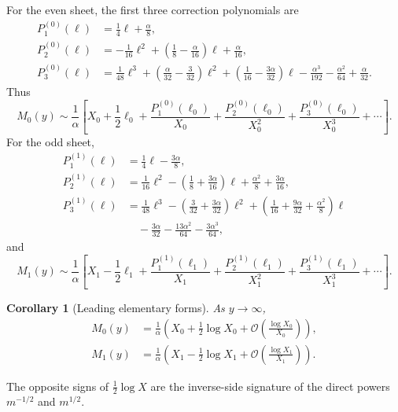 \documentclass[11pt,a4paper]{article}
\theoremstyle{clean}
\newtheorem{corollary}[theorem]{Corollary}
\theoremstyle{definition}
\newcommand{\al}{\alpha}
\newcommand{\OO}{\mathcal O}
\begin{document}
For the even sheet, the first three correction polynomials are
\begin{align}
 P_1^{(0)}(\ell)&=\frac14\ell+\frac\al8,
 \label{eq:P-even-1}\\
 P_2^{(0)}(\ell)&=-\frac1{16}\ell^2
 +\left(\frac18-\frac\al{16}\right)\ell+\frac\al{16},
 \label{eq:P-even-2}\\
 P_3^{(0)}(\ell)&=\frac1{48}\ell^3
 +\left(\frac\al{32}-\frac3{32}\right)\ell^2
 +\left(\frac1{16}-\frac{3\al}{32}\right)\ell
 -\frac{\al^3}{192}-\frac{\al^2}{64}+\frac\al{32}.
 \label{eq:P-even-3}
\end{align}
Thus
\begin{equation}
 M_0(y)\sim\frac1\al\left[
 X_0+\frac12\ell_0+
 \frac{P_1^{(0)}(\ell_0)}{X_0}+
 \frac{P_2^{(0)}(\ell_0)}{X_0^2}+
 \frac{P_3^{(0)}(\ell_0)}{X_0^3}+\cdots\right].
 \label{eq:M0-polylog}
\end{equation}
For the odd sheet,
\begin{align}
 P_1^{(1)}(\ell)&=\frac14\ell-\frac{3\al}{8},
 \label{eq:P-odd-1}\\
 P_2^{(1)}(\ell)&=\frac1{16}\ell^2
 -\left(\frac18+\frac{3\al}{16}\right)\ell
 +\frac{\al^2}{8}+\frac{3\al}{16},
 \label{eq:P-odd-2}\\
 P_3^{(1)}(\ell)&=\frac1{48}\ell^3
 -\left(\frac3{32}+\frac{3\al}{32}\right)\ell^2
 +\left(\frac1{16}+\frac{9\al}{32}+\frac{\al^2}{8}\right)\ell
 \nonumber\\
 &\quad-\frac{3\al}{32}-\frac{13\al^2}{64}-\frac{3\al^3}{64},
 \label{eq:P-odd-3}
\end{align}
and
\begin{equation}
 M_1(y)\sim\frac1\al\left[
 X_1-\frac12\ell_1+
 \frac{P_1^{(1)}(\ell_1)}{X_1}+
 \frac{P_2^{(1)}(\ell_1)}{X_1^2}+
 \frac{P_3^{(1)}(\ell_1)}{X_1^3}+\cdots\right].
 \label{eq:M1-polylog}
\end{equation}

\begin{corollary}[Leading elementary forms]
As \(y\to\infty\),
\begin{align}
 M_0(y)&=\frac1\al\left(
 X_0+\frac12\log X_0+\OO\!\left(\frac{\log X_0}{X_0}\right)\right),
 \label{eq:M0-leading}\\
 M_1(y)&=\frac1\al\left(
 X_1-\frac12\log X_1+\OO\!\left(\frac{\log X_1}{X_1}\right)\right).
 \label{eq:M1-leading}
\end{align}
\end{corollary}

The opposite signs of \(\tfrac12\log X\) are the inverse-side signature of the direct powers \(m^{-1/2}\) and \(m^{1/2}\).
\end{document}
